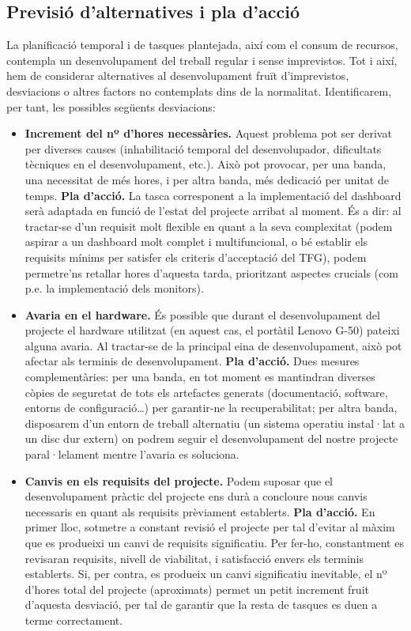\subsection{Previsió d'alternatives i pla d'acció}

La planificació temporal i de tasques plantejada, així com el consum de recursos, contempla un desenvolupament del treball regular i sense imprevistos. Tot i així, hem de considerar alternatives al desenvolupament fruït d’imprevistos, desviacions o altres factors no contemplats dins de la normalitat. Identificarem, per tant, les possibles següents desviacions:

\begin{itemize}
\item \textbf{Increment del nº d’hores necessàries.} Aquest problema pot ser derivat per diverses causes (inhabilitació temporal del desenvolupador, dificultats tècniques en el desenvolupament, etc.). Això pot provocar, per una banda, una necessitat de més hores, i per altra banda, més dedicació per unitat de temps.
\subitem \textbf{Pla d’acció.} La tasca corresponent a la implementació del dashboard serà adaptada en funció de l’estat del projecte arribat al moment. És a dir: al tractar-se d’un requisit molt flexible en quant a la seva complexitat (podem aspirar a un dashboard molt complet i multifuncional, o bé establir els requisits mínims per satisfer els criteris d’acceptació del TFG), podem permetre’ns retallar hores d’aquesta tarda, prioritzant aspectes crucials (com p.e. la implementació dels monitors). 
\item \textbf{Avaria en el hardware.} És possible que durant el desenvolupament del projecte el hardware utilitzat (en aquest cas, el portàtil Lenovo G-50) pateixi alguna avaria. Al tractar-se de la principal eina de desenvolupament, això pot afectar als terminis de desenvolupament.
\subitem \textbf{Pla d’acció.} Dues mesures complementàries: per una banda, en tot moment es mantindran diverses còpies de seguretat de tots els artefactes generats (documentació, software, entorns de configuració…) per garantir-ne la recuperabilitat; per altra banda, disposarem d’un entorn de treball alternatiu (un sistema operatiu instal·lat a un disc dur extern) on podrem seguir el desenvolupament del nostre projecte paral·lelament mentre l’avaria es soluciona.
\item \textbf{Canvis en els requisits del projecte.} Podem suposar que el desenvolupament pràctic del projecte ens durà a concloure nous canvis necessaris en quant als requisits prèviament establerts.
\subitem \textbf{Pla d’acció.} En primer lloc, sotmetre a constant revisió el projecte per tal d’evitar al màxim que es produeixi un canvi de requisits significatiu. Per fer-ho, constantment es revisaran requisits, nivell de viabilitat, i satisfacció envers els terminis establerts. Si, per contra, es produeix un canvi significatiu inevitable, el nº d’hores total del projecte (aproximats) permet un petit increment fruit d’aquesta desviació, per tal de garantir que la resta de tasques es duen a terme correctament.
\end{itemize}

